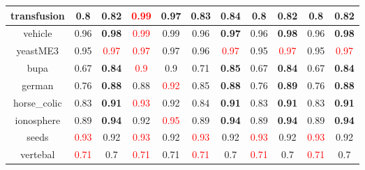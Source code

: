 \documentclass{article}%
\begin{document}
\begin{tabular}{c|cccccccccc}
transfusion&0.8&\textbf{0.82}&\textcolor{red}{ 
0.99
}&0.97&0.83&\textbf{0.84}&0.8&\textbf{0.82}&0.8&\textbf{0.82}\\%
\hline%
vehicle&0.96&\textbf{0.98}&\textcolor{red}{ 
0.99
}&0.99&0.96&\textbf{0.97}&0.96&\textbf{0.98}&0.96&\textbf{0.98}\\%
\hline%
yeastME3&0.95&\textcolor{red}{ 
0.97
}&\textcolor{red}{ 
0.97
}&0.97&0.96&\textcolor{red}{ 
0.97
}&0.95&\textcolor{red}{ 
0.97
}&0.95&\textcolor{red}{ 
0.97
}\\%
\hline%
bupa&0.67&\textbf{0.84}&\textcolor{red}{ 
0.9
}&0.9&0.71&\textbf{0.85}&0.67&\textbf{0.84}&0.67&\textbf{0.84}\\%
\hline%
german&0.76&\textbf{0.88}&0.88&\textcolor{red}{ 
0.92
}&0.85&\textbf{0.88}&0.76&\textbf{0.89}&0.76&\textbf{0.88}\\%
\hline%
horse\_colic&0.83&\textbf{0.91}&\textcolor{red}{ 
0.93
}&0.92&0.84&\textbf{0.91}&0.83&\textbf{0.91}&0.83&\textbf{0.91}\\%
\hline%
ionosphere&0.89&\textbf{0.94}&0.92&\textcolor{red}{ 
0.95
}&0.89&\textbf{0.94}&0.89&\textbf{0.94}&0.89&\textbf{0.94}\\%
\hline%
seeds&\textcolor{red}{ 
0.93
}&0.92&\textcolor{red}{ 
0.93
}&0.92&\textcolor{red}{ 
0.93
}&0.92&\textcolor{red}{ 
0.93
}&0.92&\textcolor{red}{ 
0.93
}&0.92\\%
\hline%
vertebal&\textcolor{red}{ 
0.71
}&0.7&\textcolor{red}{ 
0.71
}&0.71&\textcolor{red}{ 
0.71
}&0.7&\textcolor{red}{ 
0.71
}&0.7&\textcolor{red}{ 
0.71
}&0.7\\%
\hline%
\end{tabular}

%
\end{document}
